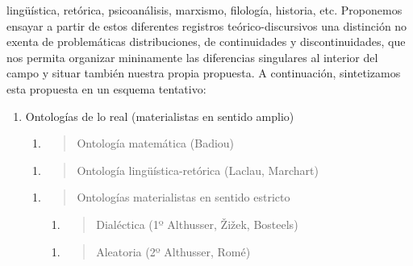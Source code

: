 \documentclass{book}
\begin{document}
lingüística, retórica, psicoanálisis, marxismo, filología, historia,
etc. Proponemos ensayar a partir de estos diferentes registros
teórico-discursivos una distinción no exenta de problemáticas
distribuciones, de continuidades y discontinuidades, que nos permita
organizar mininamente las diferencias singulares al interior del campo y
situar también nuestra propia propuesta. A continuación, sintetizamos
esta propuesta en un esquema tentativo:

\begin{enumerate}
\def\labelenumi{\arabic{enumi}.}
\item
  Ontologías de lo real (materialistas en sentido amplio)

  \begin{enumerate}
  \def\labelenumii{\arabic{enumii}.}
  \item
    \begin{quote}
    Ontología matemática (Badiou)
    \end{quote}
  \end{enumerate}

  \begin{enumerate}
  \def\labelenumii{\arabic{enumii}.}
  \item
    \begin{quote}
    Ontología lingüística-retórica (Laclau, Marchart)
    \end{quote}
  \end{enumerate}

  \begin{enumerate}
  \def\labelenumii{\arabic{enumii}.}
  \setcounter{enumii}{1}
  \item
    \begin{quote}
    Ontologías materialistas en sentido estricto
    \end{quote}

    \begin{enumerate}
    \def\labelenumiii{\arabic{enumiii}.}
    \item
      \begin{quote}
      Dialéctica (1º Althusser, Žižek, Bosteels)
      \end{quote}
    \end{enumerate}

    \begin{enumerate}
    \def\labelenumiii{\arabic{enumiii}.}
    \item
      \begin{quote}
      Aleatoria (2º Althusser, Romé)
      \end{quote}
    \end{enumerate}


\end{enumerate}
\end{enumerate}
\end{document}
